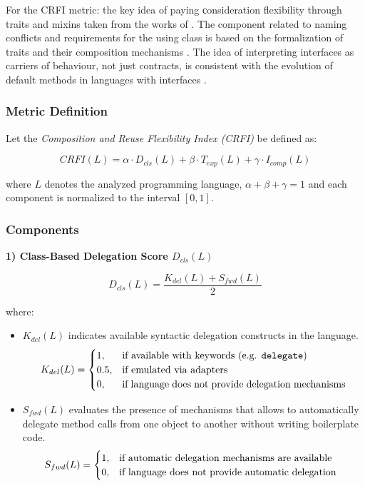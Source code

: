 For the CRFI metric: the key idea of paying сonsideration flexibility through traits and mixins taken from the works of \cite{scharli2003traits}. The component related to naming conflicts and requirements for the using class is based on the formalization of traits and their composition mechanisms \cite{scharli2003traits}. The idea of interpreting interfaces as carriers of behaviour, not just contracts, is consistent with the evolution of default methods in languages with interfaces \cite{bracha2004generics}.

\subsubsection{Metric Definition}

Let the \textit{Composition and Reuse Flexibility Index (CRFI)} be defined as:

\[
    CRFI(L) = 
    \alpha \cdot D_{cls}(L) + 
    \beta \cdot T_{exp}(L) + 
    \gamma \cdot I_{comp}(L)
\]

where $L$ denotes the analyzed programming language, $\alpha + \beta + \gamma = 1$ and each component is normalized to the interval $[0,1]$.

\subsubsection{Components}

\textbf{1) Class-Based Delegation Score $D_{cls}(L)$}

\[
D_{cls}(L) = \frac{K_{del}(L) + S_{fwd}(L)}{2}
\]

where:
\begin{itemize}
    \item $K_{del}(L)$ indicates available syntactic delegation constructs in the language.
    \[
    K_{del}(L) = 
    \begin{cases}
    1, & \text{\parbox[t]{0.65\linewidth}{\raggedright
            if available with keywords (e.g. \texttt{delegate})%
         }} \\
    0.5, & \text{\parbox[t]{0.65\linewidth}{\raggedright
            if emulated via adapters%
         }} \\
    0, & \text{\parbox[t]{0.65\linewidth}{\raggedright
            if language does not provide delegation mechanisms%
         }}
    \end{cases}
    \]
    \item $S_{fwd}(L)$ evaluates the presence of mechanisms that allows to automatically delegate method calls from one object to another without writing boilerplate code.
    \[
    S_{fwd}(L) = 
    \begin{cases}
    1, & \text{\parbox[t]{0.65\linewidth}{\raggedright
            if automatic delegation mechanisms are available%
         }} \\
    0, & \text{\parbox[t]{0.65\linewidth}{\raggedright
            if language does not provide automatic delegation%
         }}
    \end{cases}
    \]
\end{itemize}


